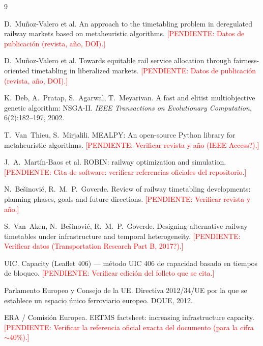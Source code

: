 \documentclass[11pt,a4paper]{article}
\newcommand{\pendiente}[1]{\textcolor{red}{[PENDIENTE: #1]}}
\begin{document}
\begin{thebibliography}{9}

D.~Muñoz-Valero et al.
\newblock An approach to the timetabling problem in deregulated railway
markets based on metaheuristic algorithms.
\newblock \pendiente{Datos de publicación (revista, año, DOI).}

D.~Muñoz-Valero et al.
\newblock Towards equitable rail service allocation through
fairness-oriented timetabling in liberalized markets.
\newblock \pendiente{Datos de publicación (revista, año, DOI).}

K.~Deb, A.~Pratap, S.~Agarwal, T.~Meyarivan.
\newblock A fast and elitist multiobjective genetic algorithm: NSGA-II.
\newblock \emph{IEEE Transactions on Evolutionary Computation},
6(2):182--197, 2002.

T.~Van~Thieu, S.~Mirjalili.
\newblock MEALPY: An open-source Python library for metaheuristic
algorithms.
\newblock \pendiente{Verificar revista y año (IEEE Access?).}

J.~A.~Martín-Baos et al.
\newblock ROBIN: railway optimization and simulation.
\newblock \pendiente{Cita de software: verificar referencias oficiales del
repositorio.}

N.~Bešinović, R.~M.~P.~Goverde.
\newblock Review of railway timetabling developments: planning phases,
goals and future directions.
\newblock \pendiente{Verificar revista y año.}

S.~Van~Aken, N.~Bešinović, R.~M.~P.~Goverde.
\newblock Designing alternative railway timetables under infrastructure and
temporal heterogeneity.
\newblock \pendiente{Verificar datos (Transportation Research Part B,
2017?).}

UIC.
\newblock Capacity (Leaflet 406) --- método UIC 406 de capacidad basado en
tiempos de bloqueo.
\newblock \pendiente{Verificar edición del folleto que se cita.}

Parlamento Europeo y Consejo de la UE.
\newblock Directiva 2012/34/UE por la que se establece un espacio único
ferroviario europeo.
\newblock DOUE, 2012.

ERA / Comisión Europea.
\newblock ERTMS factsheet: increasing infrastructure capacity.
\newblock \pendiente{Verificar la referencia oficial exacta del documento
(para la cifra $\sim$40\%).}

\end{thebibliography}
\end{document}
